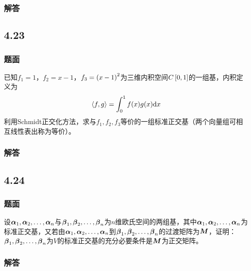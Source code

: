 \documentclass{beamer}
\begin{document}
\begin{frame}
    \frametitle{解答}



\end{frame}

\subsection*{4.23}
\begin{frame}
    \frametitle{题面}

    已知\(f_1=1\)，\(f_2=x-1\)，\(f_3=\mypar{x-1}^2\)为三维内积空间\(C\mat{0,1}\)的一组基，内积定义为
    \begin{equation*}
        \indot{f}{g}=\int_0^1f(x)g(x)\mathrm{d}x
    \end{equation*}
    利用Schmidt正交化方法，求与\(f_1,f_2,f_3\)等价的一组标准正交基（两个向量组可相互线性表出称为等价）。

\end{frame}

\begin{frame}
    \frametitle{解答}



\end{frame}

\subsection*{4.24}
\begin{frame}
    \frametitle{题面}

    设\(\enums{\vecal}{n}\)与\(\enums{\vecbeta}{n}\)为\(n\)维欧氏空间的两组基，其中\(\enums{\vecal}{n}\)为标准正交基，又若由\(\enums{\vecal}{n}\)到\(\enums{\vecbeta}{n}\)的过渡矩阵为\(\matm\)，证明：\(\enums{\vecbeta}{n}\)为\(V\)的标准正交基的充分必要条件是\(\matm\)为正交矩阵。

\end{frame}

\begin{frame}
    \frametitle{解答}



\end{frame}
\end{document}
